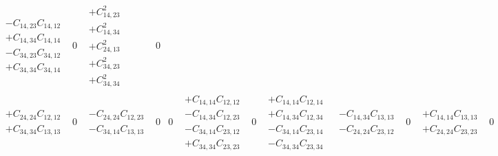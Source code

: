 \documentclass[pra,nofootinbib]{revtex4-1}
\newcommand{\C}[2]{C_{{#1},{#2}}}
\begin{document}
\begin{eqnarray}
\begin{array}{cccccccccccccccc}
     \begin{array}{c}
     - \C{14}{23}\C{14}{12} \\
     + \C{14}{34}\C{14}{14} \\
     - \C{34}{23}\C{34}{12} \\
     + \C{34}{34}\C{34}{14} 
     \end{array} &
     0 &
     \begin{array}{c}
     + \C{14}{23}^2 \\
     + \C{14}{34}^2 \\
     + \C{24}{13}^2 \\
     + \C{34}{23}^2 \\
     + \C{34}{34}^2 
     \end{array} &
     0 \\
     \begin{array}{c}
     + \C{24}{24}\C{12}{12} \\
     + \C{34}{34}\C{13}{13} 
     \end{array} &
     0 &
     \begin{array}{c}
     - \C{24}{24}\C{12}{23} \\
     - \C{34}{14}\C{13}{13} 
     \end{array} &
     0 &
     0 &
     \begin{array}{c}
     + \C{14}{14}\C{12}{12} \\
     - \C{14}{34}\C{12}{23} \\
     - \C{34}{14}\C{23}{12} \\
     + \C{34}{34}\C{23}{23} 
     \end{array} &
     0 &
     \begin{array}{c}
     + \C{14}{14}\C{12}{14} \\
     + \C{14}{34}\C{12}{34} \\
     - \C{34}{14}\C{23}{14} \\
     - \C{34}{34}\C{23}{34} 
     \end{array} &
     \begin{array}{c}
     - \C{14}{34}\C{13}{13} \\
     - \C{24}{24}\C{23}{12} 
     \end{array} &
     0 &
     \begin{array}{c}
     + \C{14}{14}\C{13}{13} \\
     + \C{24}{24}\C{23}{23} 
     \end{array} &
     0 &
     0 &
     \begin{array}{c}
     + \C{14}{14}\C{14}{12} \\

\end{array}
\end{array}
\end{eqnarray}
\end{document}
